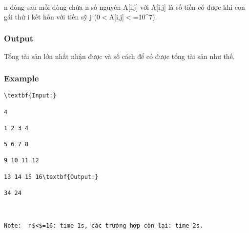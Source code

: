    n dòng sau mỗi dòng chứa n số nguyên A[i,j] với A[i,j] là số tiền có được khi con gái thứ i kết hôn với tiến sỹ j (0$<$A[i,j]$<$=10\textasciicircum7).  

\subsubsection{   Output  }

   Tổng tài sản lớn nhất nhận được và số cách để có được tổng tài sản như thế.  

\subsubsection{   Example  }
\begin{verbatim}
\textbf{Input:}

4

1 2 3 4

5 6 7 8

9 10 11 12

13 14 15 16\textbf{Output:}

34 24

 

Note:  n$<$=16: time 1s, các trường hợp còn lại: time 2s.\end{verbatim}